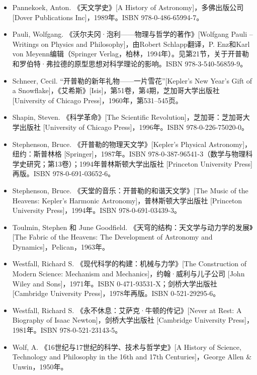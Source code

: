 \begin{itemize}
\item Pannekoek, Anton. 《天文学史》[A History of Astronomy]，多佛出版公司 [Dover Publications Inc]，1989年。ISBN 978-0-486-65994-7。
\item Pauli, Wolfgang. 《沃尔夫冈·泡利——物理与哲学的著作》[Wolfgang Pauli – Writings on Physics and Philosophy]，由Robert Schlapp翻译，P. Enz和Karl von Meyenn编辑（Springer Verlag，柏林，1994年）。见第21节，关于开普勒和罗伯特·弗拉德的原型思想对科学理论的影响。ISBN 978-3-540-56859-9。
\item Schneer, Cecil. “开普勒的新年礼物——一片雪花”[Kepler's New Year's Gift of a Snowflake]，《艾希斯》[Isis]，第51卷，第4期，芝加哥大学出版社 [University of Chicago Press]，1960年，第531–545页。
\item Shapin, Steven. 《科学革命》[The Scientific Revolution]，芝加哥：芝加哥大学出版社 [University of Chicago Press]，1996年。ISBN 978-0-226-75020-0。
\item Stephenson, Bruce. 《开普勒的物理天文学》[Kepler's Physical Astronomy]，纽约：斯普林格 [Springer]，1987年。ISBN 978-0-387-96541-3（数学与物理科学史研究；第13卷）；1994年普林斯顿大学出版社 [Princeton University Press]再版。ISBN 978-0-691-03652-6。
\item Stephenson, Bruce. 《天堂的音乐：开普勒的和谐天文学》[The Music of the Heavens: Kepler's Harmonic Astronomy]，普林斯顿大学出版社 [Princeton University Press]，1994年。ISBN 978-0-691-03439-3。
\item Toulmin, Stephen 和 June Goodfield. 《天穹的结构：天文学与动力学的发展》[The Fabric of the Heavens: The Development of Astronomy and Dynamics]，Pelican，1963年。
\item Westfall, Richard S. 《现代科学的构建：机械与力学》[The Construction of Modern Science: Mechanism and Mechanics]，约翰·威利与儿子公司 [John Wiley and Sons]，1971年。ISBN 0-471-93531-X；剑桥大学出版社 [Cambridge University Press]，1978年再版。ISBN 0-521-29295-6。
\item Westfall, Richard S. 《永不休息：艾萨克·牛顿的传记》[Never at Rest: A Biography of Isaac Newton]，剑桥大学出版社 [Cambridge University Press]，1981年。ISBN 978-0-521-23143-5。
\item Wolf, A. 《16世纪与17世纪的科学、技术与哲学史》[A History of Science, Technology and Philosophy in the 16th and 17th Centuries]，George Allen & Unwin，1950年。
\end{itemize}
